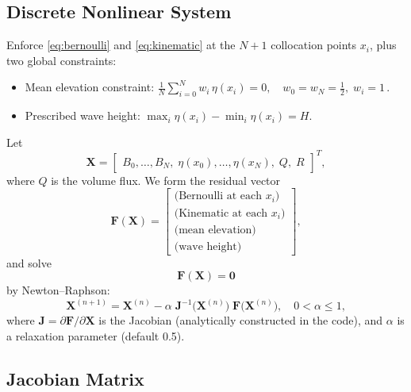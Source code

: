 \documentclass{article}
\begin{document}
\subsection{Discrete Nonlinear System}

Enforce \eqref{eq:bernoulli} and \eqref{eq:kinematic} at the $N+1$ collocation points $x_i$, plus two global constraints:
\begin{itemize}
  \item Mean elevation constraint: \(\displaystyle \frac{1}{N}\sum_{i=0}^N w_i\,\eta(x_i)=0,\quad w_0=w_N=\tfrac12,\;w_i=1\,.\)
  \item Prescribed wave height: \(\max_i\eta(x_i)-\min_i\eta(x_i)=H.\)
\end{itemize}
Let
\[
\mathbf{X} = \begin{bmatrix}
B_0,\dots,B_N,\;
\eta(x_0),\dots,\eta(x_N),\;
Q,\;R
\end{bmatrix}^T,
\]
where $Q$ is the volume flux.  We form the residual vector
\[
\mathbf{F}(\mathbf{X}) = 
\begin{bmatrix}
\text{(Bernoulli at each }x_i)\\
\text{(Kinematic at each }x_i)\\
\text{(mean elevation)}\\
\text{(wave height)}
\end{bmatrix},
\]
and solve 
\[
\mathbf{F}(\mathbf{X}) = \mathbf{0}
\]
by Newton–Raphson:
\begin{equation}
\mathbf{X}^{(n+1)}
= \mathbf{X}^{(n)} 
- \alpha
\;\mathbf{J}^{-1}\!\bigl(\mathbf{X}^{(n)}\bigr)
\;\mathbf{F}\bigl(\mathbf{X}^{(n)}\bigr),
\quad 0<\alpha\le1,
\end{equation}
where $\mathbf{J} = \partial\mathbf{F}/\partial\mathbf{X}$ is the Jacobian (analytically constructed in the code), and $\alpha$ is a relaxation parameter (default 0.5).

\subsection{Jacobian Matrix}
\label{sec:jacobian}
\end{document}
